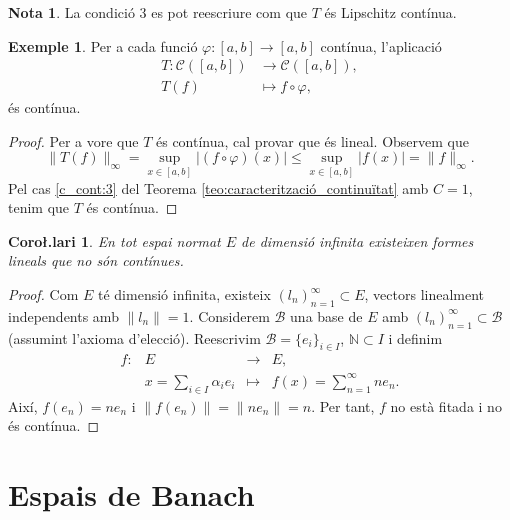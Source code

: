 \documentclass[12pt]{book}
\newtheorem{coro}[teorema]{Coro\l.lari}
\theoremstyle{definition}
\theoremstyle{nota}
\newtheorem{nota}[teorema]{Nota}
\theoremstyle{exemple}
\newtheorem{exemple}[teorema]{Exemple}
\begin{document}
\begin{nota}
  La condició 3 es pot reescriure com que $T$ és Lipschitz contínua.
\end{nota}

\begin{exemple}
  Per a cada funció $\varphi : [a,b] \to [a,b]$ contínua, l'aplicació
  \begin{align*}
    T : \mathcal C([a,b]) &\longrightarrow \mathcal C([a,b]), \\
    T (f) &\longmapsto f \circ \varphi, 
  \end{align*}
  és contínua.
\end{exemple}

\begin{proof}
  Per a vore que $T$ és contínua, cal provar que és lineal. Observem
  que
  \[
    \|T(f)\|_\infty = \sup_{x\in[a,b]} \left|(f\circ\varphi)(x)\right|
    \leq \sup_{x\in[a,b]}|f(x)| = \|f\|_\infty.
  \]
  Pel cas \ref{c_cont:3} del Teorema
  \ref{teo:caracterització_continuïtat} amb $C=1$, tenim que $T$ és
  contínua.
\end{proof}

\begin{coro}
  En tot espai normat $E$ de dimensió infinita existeixen formes
  lineals que no són contínues.
\end{coro}

\begin{proof}
  Com $E$ té dimensió infinita, existeix
  $(l_n)_{n=1}^\infty \subset E$, vectors linealment independents amb
  $\|l_n\| = 1$. Considerem $\mathcal{B}$ una base de $E$ amb
  $(l_n)_{n=1}^\infty \subset \mathcal{B}$ (assumint l'axioma
  d'elecció). Reescrivim $\mathcal{B} = \{e_i\}_{i \in I}$,
  $\mathbb{N} \subset I$ i definim
  \begin{equation*}
    \begin{array}{lrcl}
      f : & E &\longrightarrow& E, \\
          & x = \sum\limits_{i \in I}\alpha_ie_i
              &\longmapsto& f(x) = \sum\limits_{n=1}^{\infty} ne_n.
    \end{array}
  \end{equation*}
  Així, $f(e_n) = ne_n$ i $\|f(e_n)\| = \|ne_n\| = n$. Per tant, $f$
  no està fitada i no és contínua.
\end{proof}

\section{Espais de Banach}
\end{document}
